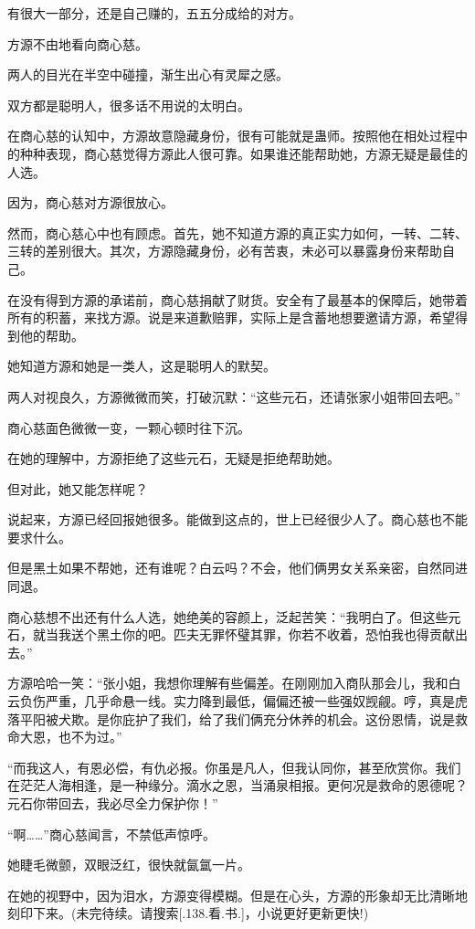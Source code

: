 \begin{this_body}
有很大一部分，还是自己赚的，五五分成给的对方。

方源不由地看向商心慈。

两人的目光在半空中碰撞，渐生出心有灵犀之感。

双方都是聪明人，很多话不用说的太明白。

在商心慈的认知中，方源故意隐藏身份，很有可能就是蛊师。按照他在相处过程中的种种表现，商心慈觉得方源此人很可靠。如果谁还能帮助她，方源无疑是最佳的人选。

因为，商心慈对方源很放心。

然而，商心慈心中也有顾虑。首先，她不知道方源的真正实力如何，一转、二转、三转的差别很大。其次，方源隐藏身份，必有苦衷，未必可以暴露身份来帮助自己。

在没有得到方源的承诺前，商心慈捐献了财货。安全有了最基本的保障后，她带着所有的积蓄，来找方源。说是来道歉赔罪，实际上是含蓄地想要邀请方源，希望得到他的帮助。

她知道方源和她是一类人，这是聪明人的默契。

两人对视良久，方源微微而笑，打破沉默：“这些元石，还请张家小姐带回去吧。”

商心慈面色微微一变，一颗心顿时往下沉。

在她的理解中，方源拒绝了这些元石，无疑是拒绝帮助她。

但对此，她又能怎样呢？

说起来，方源已经回报她很多。能做到这点的，世上已经很少人了。商心慈也不能要求什么。

但是黑土如果不帮她，还有谁呢？白云吗？不会，他们俩男女关系亲密，自然同进同退。

商心慈想不出还有什么人选，她绝美的容颜上，泛起苦笑：“我明白了。但这些元石，就当我送个黑土你的吧。匹夫无罪怀璧其罪，你若不收着，恐怕我也得贡献出去。”

方源哈哈一笑：“张小姐，我想你理解有些偏差。在刚刚加入商队那会儿，我和白云负伤严重，几乎命悬一线。实力降到最低，偏偏还被一些强奴觊觎。哼，真是虎落平阳被犬欺。是你庇护了我们，给了我们俩充分休养的机会。这份恩情，说是救命大恩，也不为过。”

“而我这人，有恩必偿，有仇必报。你虽是凡人，但我认同你，甚至欣赏你。我们在茫茫人海相逢，是一种缘分。滴水之恩，当涌泉相报。更何况是救命的恩德呢？元石你带回去，我必尽全力保护你！”

“啊……”商心慈闻言，不禁低声惊呼。

她睫毛微颤，双眼泛红，很快就氤氲一片。

在她的视野中，因为泪水，方源变得模糊。但是在心头，方源的形象却无比清晰地刻印下来。(未完待续。请搜索[.138.看.书.]，小说更好更新更快!)

\end{this_body}

